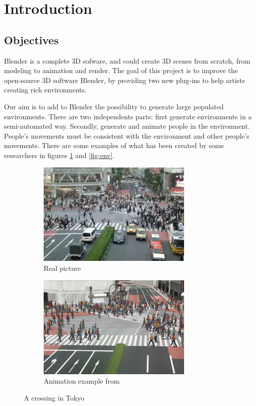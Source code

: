 \section{Introduction}

\subsection{Objectives}

Blender is a complete 3D sofware, and could create 3D scenes from scratch, from modeling to animation
and render. The goal of this project is to improve the open-source 3D
software Blender, by providing two new plug-ins to help artists creating rich environments.

Our aim is to add to Blender the possibility to generate large
populated environments. There are two independents parts: first
generate environments in a semi-automated way. Secondly, generate and
animate people in the environment. People's movements must be consistent
with the environment and other people's movements. There are some
examples of what has been created by some researchers in figures
\ref{fig:crowd} and \ref{fig:env}.

\begin{figure}[h] \centering

  \begin{subfigure}[t]{0.5\textwidth}
    \includegraphics[width=7.5cm]{img/PLE_real.png}
    \caption{Real picture}
  \end{subfigure}%
  \begin{subfigure}[t]{0.5\textwidth}
    \includegraphics[width=7.5cm]{img/PLE_simu.png}
    \caption{Animation example from \cite{PLE}}
  \end{subfigure}
  \caption{A crossing in Tokyo}
  \label{fig:crowd}
\end{figure}

